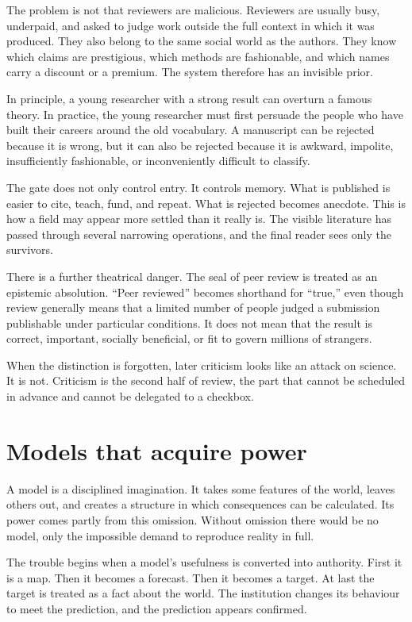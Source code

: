 ﻿\documentclass[12pt,a4paper]{book}
\begin{document}
The problem is not that reviewers are malicious. Reviewers are usually busy,
underpaid, and asked to judge work outside the full context in which it was
produced. They also belong to the same social world as the authors. They know
which claims are prestigious, which methods are fashionable, and which names
carry a discount or a premium. The system therefore has an invisible prior.

In principle, a young researcher with a strong result can overturn a famous
theory. In practice, the young researcher must first persuade the people who
have built their careers around the old vocabulary. A manuscript can be
rejected because it is wrong, but it can also be rejected because it is
awkward, impolite, insufficiently fashionable, or inconveniently difficult
to classify.

The gate does not only control entry. It controls memory. What is published is
easier to cite, teach, fund, and repeat. What is rejected becomes anecdote.
This is how a field may appear more settled than it really is. The visible
literature has passed through several narrowing operations, and the final
reader sees only the survivors.

There is a further theatrical danger. The seal of peer review is treated as an
epistemic absolution. ``Peer reviewed'' becomes shorthand for ``true,'' even
though review generally means that a limited number of people judged a
submission publishable under particular conditions. It does not mean that the
result is correct, important, socially beneficial, or fit to govern millions
of strangers.

When the distinction is forgotten, later criticism looks like an attack on
science. It is not. Criticism is the second half of review, the part that
cannot be scheduled in advance and cannot be delegated to a checkbox.

\section{Models that acquire power}

A model is a disciplined imagination. It takes some features of the world,
leaves others out, and creates a structure in which consequences can be
calculated. Its power comes partly from this omission. Without omission there
would be no model, only the impossible demand to reproduce reality in full.

The trouble begins when a model's usefulness is converted into authority.
First it is a map. Then it becomes a forecast. Then it becomes a target. At
last the target is treated as a fact about the world. The institution changes
its behaviour to meet the prediction, and the prediction appears confirmed.
\end{document}
